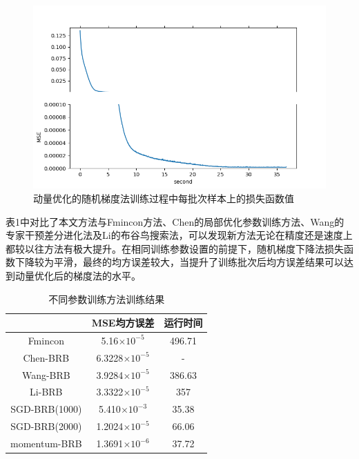 \documentclass{cjc}
\begin{document}
\begin{figure}
	\includegraphics[width=\linewidth]{momentum_loss.png}
	\caption{动量优化的随机梯度法训练过程中每批次样本上的损失函数值}
\end{figure}

表1中对比了本文方法与Fmincon方法、Chen的局部优化参数训练方法、Wang的专家干预差分进化法及Li的布谷鸟搜索法，可以发现新方法无论在精度还是速度上都较以往方法有极大提升。在相同训练参数设置的前提下，随机梯度下降法损失函数下降较为平滑，最终的均方误差较大，当提升了训练批次后均方误差结果可以达到动量优化后的梯度法的水平。
\begin{table}
	\centering
	\caption{不同参数训练方法训练结果}
	\small
	\begin{tabular}{ccc}
		\toprule
	 	& MSE均方误差 & 运行时间  \\
		\midrule
		Fmincon & 5.16$\times 10^{-5}$ & 496.71\\
		Chen-BRB & 6.3228$\times 10^{-5}$ & -\\
		Wang-BRB & 3.9284$\times 10^{-5}$ & 386.63\\
		Li-BRB & 3.3322$\times 10^{-5}$ & 357\\
		SGD-BRB(1000) & 5.410$\times 10^{-3}$ & 35.38\\
		SGD-BRB(2000) & 1.2024$\times 10^{-5}$ & 66.06\\
		momentum-BRB & 1.3691$\times 10^{-6}$ & 37.72\\
		\bottomrule
	\end{tabular}
\end{table}
\end{document}
